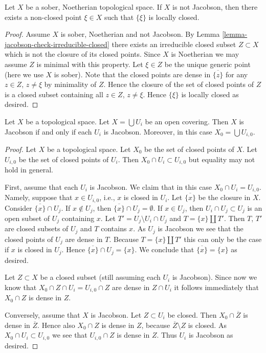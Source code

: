 \begin{lemma}
\label{lemma-non-jacobson-Noetherian-characterize}
Let $X$ be a sober, Noetherian topological space.
If $X$ is not Jacobson, then there exists a non-closed point
$\xi \in X$ such that $\{\xi\}$ is locally closed.
\end{lemma}

\begin{proof}
Assume $X$ is sober, Noetherian and not Jacobson.
By Lemma \ref{lemma-jacobson-check-irreducible-closed} there exists
an irreducible closed subset $Z \subset X$ which is not the closure
of its closed points. Since $X$ is Noetherian we may assume $Z$ is
minimal with this property. Let $\xi \in Z$ be the unique generic point
(here we use $X$ is sober). Note that the closed points are dense in
$\overline{\{z\}}$ for any $z \in Z$, $z \not = \xi$ by minimality
of $Z$. Hence the closure of the set of closed points of $Z$ is
a closed subset containing all $z \in Z$, $z \not = \xi$. Hence
$\{\xi\}$ is locally closed as desired.
\end{proof}

\begin{lemma}
\label{lemma-jacobson-local}
Let $X$ be a topological space.
Let $X = \bigcup U_i$ be an open covering.
Then $X$ is Jacobson if and only if each $U_i$ is Jacobson.
Moreover, in this case $X_0 = \bigcup U_{i, 0}$.
\end{lemma}

\begin{proof}
Let $X$ be a topological space.
Let $X_0$ be the set of closed points of $X$.
Let $U_{i, 0}$ be the set of closed points of
$U_i$. Then $X_0 \cap U_i \subset U_{i, 0}$
but equality may not hold in general.

\medskip\noindent
First, assume that each $U_i$ is Jacobson.
We claim that in this case $X_0 \cap U_i = U_{i, 0}$.
Namely, suppose that $x \in U_{i, 0}$, i.e., $x$ is closed in
$U_i$. Let $\overline{\{x\}}$ be the closure
in $X$. Consider $\overline{\{x\}} \cap U_j$.
If $x \not \in U_j$, then $\overline{\{x\}} \cap U_j = \emptyset$.
If $x \in U_j$, then $U_i \cap U_j \subset U_j$
is an open subset of $U_j$ containing $x$.
Let $T' = U_j \setminus U_i \cap U_j$ and
$T = \{x\} \coprod T'$. Then $T$, $T'$
are closed subsets of $U_j$ and $T$ contains
$x$. As $U_j$ is Jacobson we see that the closed points of
$U_j$ are dense in $T$. Because $T = \{x\} \coprod T'$
this can only be the case if $x$ is closed in $U_j$.
Hence $\overline{\{x\}} \cap U_j = \{x\}$. We conclude
that $\overline{\{x\}} = \{ x \}$ as desired.

\medskip\noindent
Let $Z \subset X$ be a closed subset (still
assuming each $U_i$ is Jacobson).
Since now we know that $X_0 \cap Z  \cap U_i
= U_{i, 0} \cap Z$ are dense in $Z \cap U_i$
it follows immediately that $X_0 \cap Z$ is
dense in $Z$.

\medskip\noindent
Conversely, assume that $X$ is Jacobson.
Let $Z \subset U_i$ be closed. Then
$X_0 \cap \overline{Z}$ is dense in $\overline{Z}$.
Hence also $X_0 \cap Z$ is dense in $Z$, because
$\overline{Z} \setminus Z$ is closed. As $X_0 \cap U_i
\subset U_{i, 0}$ we see that
$U_{i, 0} \cap Z$ is dense in $Z$.
Thus $U_i$ is Jacobson as desired.
\end{proof}

